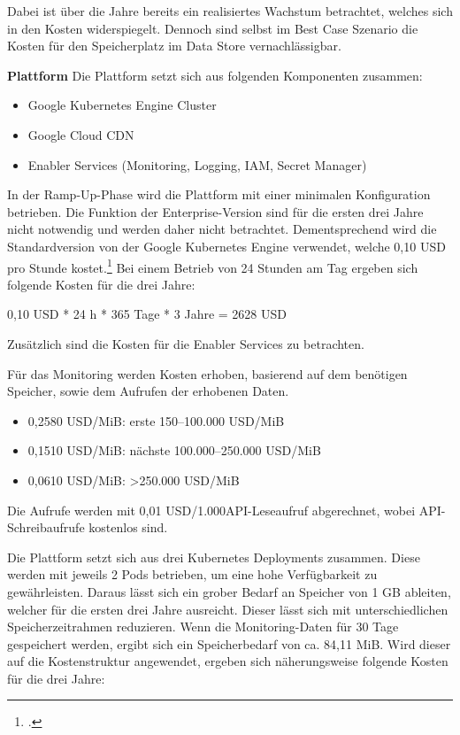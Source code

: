Dabei ist über die Jahre bereits ein realisiertes Wachstum betrachtet, welches sich in den Kosten widerspiegelt.
Dennoch sind selbst im Best Case Szenario die Kosten für den Speicherplatz im Data Store vernachlässigbar.

\textbf{Plattform}
Die Plattform setzt sich aus folgenden Komponenten zusammen:
\begin{itemize}
    \item Google Kubernetes Engine Cluster
    \item Google Cloud CDN
    \item Enabler Services (Monitoring, Logging, IAM, Secret Manager)
\end{itemize}

In der Ramp-Up-Phase wird die Plattform mit einer minimalen Konfiguration betrieben.
Die Funktion der Enterprise-Version sind für die ersten drei Jahre nicht notwendig und werden daher nicht betrachtet.
Dementsprechend wird die Standardversion von der Google Kubernetes Engine verwendet, welche 0,10 USD pro Stunde kostet.\footcite{GoogleKubernetesEnginePricing2025}
Bei einem Betrieb von 24 Stunden am Tag ergeben sich folgende Kosten für die drei Jahre:

0,10 USD * 24 h * 365 Tage * 3 Jahre = 2628 USD

Zusätzlich sind die Kosten für die Enabler Services zu betrachten.

Für das Monitoring werden Kosten erhoben, basierend auf dem benötigen Speicher, sowie dem Aufrufen der erhobenen Daten.

\begin{itemize}
    \item 0,2580 USD/MiB: erste 150–100.000 USD/MiB
    \item 0,1510 USD/MiB: nächste 100.000–250.000 USD/MiB
    \item 0,0610 USD/MiB: >250.000 USD/MiB
\end{itemize}

Die Aufrufe werden mit 0,01 USD/1.000API-Leseaufruf abgerechnet, wobei API-Schreibaufrufe kostenlos sind.

Die Plattform setzt sich aus drei Kubernetes Deployments zusammen.
Diese werden mit jeweils 2 Pods betrieben, um eine hohe Verfügbarkeit zu gewährleisten.
Daraus lässt sich ein grober Bedarf an Speicher von 1 GB ableiten, welcher für die ersten drei Jahre ausreicht.
Dieser lässt sich mit unterschiedlichen Speicherzeitrahmen reduzieren.
Wenn die Monitoring-Daten für 30 Tage gespeichert werden, ergibt sich ein Speicherbedarf von ca. 84,11 MiB.
Wird dieser auf die Kostenstruktur angewendet, ergeben sich näherungsweise folgende Kosten für die drei Jahre:

